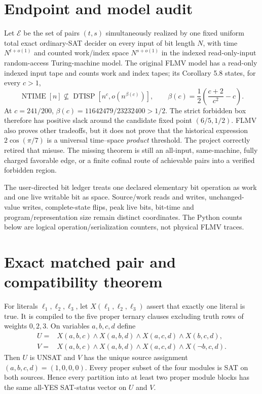 \documentclass[11pt]{article}
\begin{document}
\section{Endpoint and model audit}
Let $\mathcal E$ be the set of pairs $(t,s)$ simultaneously realized by one
fixed uniform total exact ordinary-SAT decider on every input of bit length
$N$, with time $N^{t+o(1)}$ and counted work/index space $N^{s+o(1)}$ in the
indexed read-only-input random-access Turing-machine model.  The original
FLMV model has a read-only indexed input tape and counts work and index tapes;
its Corollary 5.8 states, for every $c>1$,
\[
 \operatorname{NTIME}[n]\not\subseteq
 \operatorname{DTISP}\left[n^c,
 o\!\left(n^{\beta(c)}\right)\right],\qquad
 \beta(c)=\frac12\left(\frac{c+2}{c^2}-c\right).
\]
At $c=241/200$, $\beta(c)=11642479/23232400>1/2$.
The strict forbidden box therefore has positive slack around the candidate
fixed point $(6/5,1/2)$.  FLMV also proves other tradeoffs, but it does not
prove that the historical expression $2\cos(\pi/7)$ is a universal
time--space \emph{product} threshold.  The project correctly retired that
misuse.  The missing theorem is still an all-input, same-machine, fully
charged favorable edge, or a finite cofinal route of achievable pairs into a
verified forbidden region.

The user-directed bit ledger treats one declared elementary bit operation as
work and one live writable bit as space.  Source/work reads and writes,
unchanged-value writes, complete-state flips, peak live bits, bit-time and
program/representation size remain distinct coordinates.  The Python counts
below are logical operation/serialization counters, not physical FLMV traces.

\section{Exact matched pair and compatibility theorem}
For literals $\ell_1,\ell_2,\ell_3$, let
$X(\ell_1,\ell_2,\ell_3)$ assert that exactly one literal is true.  It is
compiled to the five proper ternary clauses excluding truth rows of weights
$0,2,3$.  On variables $a,b,c,d$ define
\begin{align*}
 U={}&X(a,b,c)\wedge X(a,b,d)\wedge X(a,c,d)\wedge X(b,c,d),\\
 V={}&X(a,b,c)\wedge X(a,b,d)\wedge X(a,c,d)\wedge X(\neg b,c,d).
\end{align*}
Then $U$ is UNSAT and $V$ has the unique source assignment
$(a,b,c,d)=(1,0,0,0)$.  Every proper subset of the four modules is SAT on
both sources.  Hence every partition into at least two proper module blocks
has the same all-YES SAT-status vector on $U$ and $V$.
\end{document}
